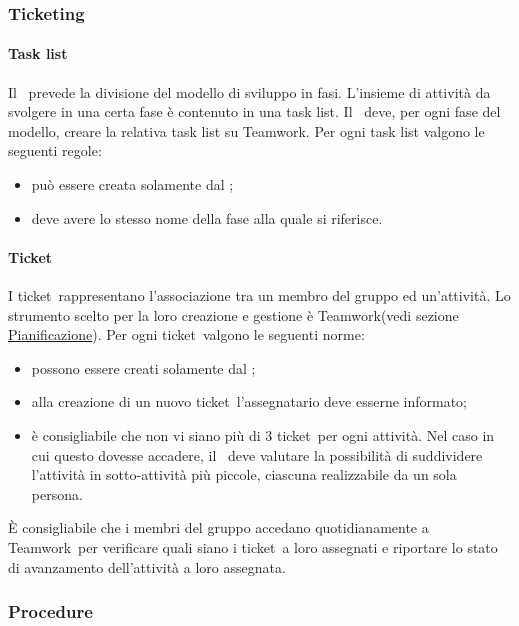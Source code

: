 \documentclass[../NormeProgetto.tex]{subfiles}
\begin{document}
	\subsubsection{Ticketing}
		\paragraph{Task list}
			Il \pianodiprogetto\ prevede la divisione del modello di sviluppo in fasi. L'insieme di attività da svolgere in una certa fase è contenuto in una task list. Il \responsabilediprogetto\ deve, per ogni fase del modello, creare la relativa task list su Teamwork. Per ogni task list valgono le seguenti regole:
			\begin{itemize}
				\item può essere creata solamente dal \responsabilediprogetto;
				\item deve avere lo stesso nome della fase alla quale si riferisce.
			\end{itemize}
			
		\paragraph{Ticket}
			I ticket\g\ rappresentano l'associazione tra un membro del gruppo ed un'attività. Lo strumento scelto per la loro creazione e gestione è Teamwork\g (vedi sezione \hyperref[sec: Pianificazione Teamwork]{Pianificazione}). Per ogni ticket\g\ valgono le seguenti norme:
			\begin{itemize}
				\item possono essere creati solamente dal \responsabilediprogetto;
				\item alla creazione di un nuovo ticket\g\ l'assegnatario deve esserne informato;
				\item è consigliabile che non vi siano più di 3 ticket\g\ per ogni attività. Nel caso in cui questo dovesse accadere, il \responsabilediprogetto\ deve valutare la possibilità di suddividere l'attività in sotto-attività più piccole, ciascuna realizzabile da un sola persona.
			\end{itemize}			 
			 È consigliabile che i membri del gruppo accedano quotidianamente a Teamwork\g\ per verificare quali siano i ticket\g\ a loro assegnati e riportare lo stato di avanzamento dell'attività a loro assegnata.

		\subsubsection{Procedure}
\end{document}
